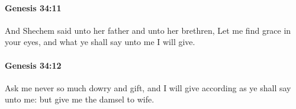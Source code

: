 		\paragraph{Genesis 34:11} %
			\label{GENESIS-34-11}

			And Shechem said unto her father and unto her brethren, Let me find grace in your eyes, and what ye shall say unto me I will give.


		\paragraph{Genesis 34:12} %
			\label{GENESIS-34-12}

			Ask me never so much dowry and gift, and I will give according as ye shall say unto me: but give me the damsel to wife.


